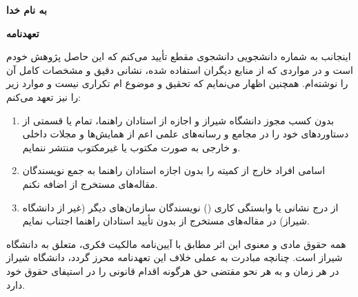\centerline{\textbf{به نام خدا}}

\vspace{\baselineskip}
\centerline{\textbf{تعهدنامه}}

\vspace{\baselineskip}
اینجانب {\PersianName} به شماره دانشجویی {\PersianStudentNumber} دانشجوی مقطع {\PersianDegree} تأیید می‌کنم که این {\PersianType} حاصل پژوهش خودم است و در مواردی که از منابع دیگران استفاده شده، نشانی دقیق و مشخصات کامل آن را نوشته‌ام. همچنین اظهار می‌نمایم که تحقیق و موضوع {\PersianType}‌ام تکراری نیست و موارد زیر را نیز تعهد می‌کنم:

\begin{enumerate}[label=\arabic*-]
    \item بدون کسب مجوز دانشگاه شیراز و اجازه از استادان راهنما، تمام یا قسمتی از دستاوردهای {\PersianType} خود را در مجامع و رسانه‌های علمی اعم از همایش‌ها و مجلات داخلی و خارجی به صورت مکتوب یا غیرمکتوب منتشر ننمایم.
    \item اسامی افراد خارج از کمیته {\PersianType} را بدون اجازه استادان راهنما به جمع نویسندگان مقاله‌های مستخرج از {\PersianType} اضافه نکنم.
    \item از درج نشانی یا وابستگی کاری () نویسندگان سازمان‌های دیگر (غیر از دانشگاه شیراز) در مقاله‌های مستخرج از {\PersianType} بدون تأیید استادان راهنما اجتناب نمایم.
\end{enumerate}

همه حقوق مادی و معنوی این اثر مطابق با آیین‌نامه مالکیت فکری، متعلق به دانشگاه شیراز است. چنانچه مبادرت به عملی خلاف این تعهدنامه محرز گردد، دانشگاه شیراز در هر زمان و به هر نحو مقتضی حق هرگونه اقدام قانونی را در استیفای حقوق خود دارد.

\vspace{2\baselineskip}
\centerline{\PersianName}
\centerline{\PersianDefenseDate}
